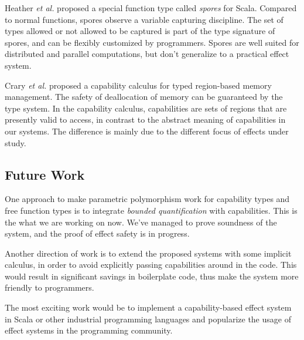 Heather \emph{et al.} proposed a special function type called
\emph{spores} for Scala\cite{miller2014spores}. Compared to normal
functions, spores observe a variable capturing discipline. The set of
types allowed or not allowed to be captured is part of the type
signature of spores, and can be flexibly customized by
programmers. Spores are well suited for distributed and parallel
computations, but don't generalize to a practical effect system.

Crary \emph{et al.} proposed a capability calculus for typed
region-based memory management\cite{crary1999typed}. The safety of
deallocation of memory can be guaranteed by the type system. In the
capability calculus, capabilities are sets of regions that are
presently valid to access, in contrast to the abstract meaning of
capabilities in our systems. The difference is mainly due to the
different focus of effects under study.

\subsection{Future Work}

One approach to make parametric polymorphism work for capability types
and free function types is to integrate \emph{bounded quantification}
with capabilities. This is the what we are working on now. We've
managed to prove soundness of the system, and the proof of effect
safety is in progress.

Another direction of work is to extend the proposed systems with some
implicit calculus, in order to avoid explicitly passing capabilities
around in the code. This would result in significant savings in
boilerplate code, thus make the system more friendly to programmers.

The most exciting work would be to implement a capability-based effect
system in Scala or other industrial programming languages and
popularize the usage of effect systems in the programming community.
